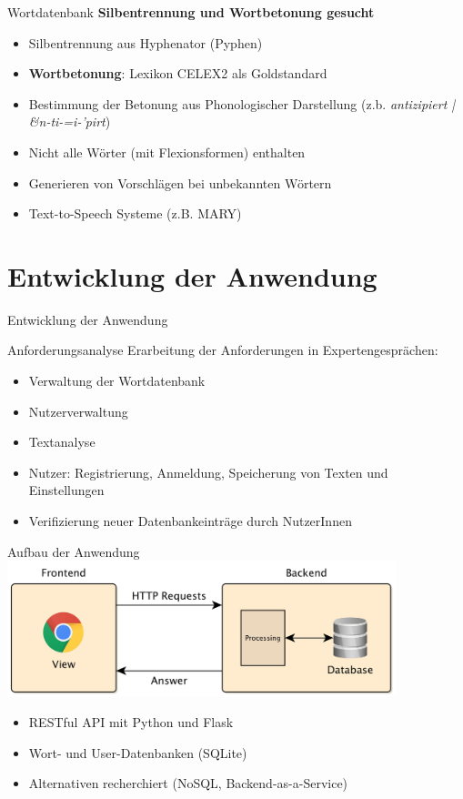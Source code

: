 \documentclass{beamer}
\begin{document}
\begin{frame}{Wortdatenbank}
\textbf{Silbentrennung und Wortbetonung gesucht}
\begin{itemize}
	\item Silbentrennung aus Hyphenator (Pyphen)
	\item \textbf{Wortbetonung}: Lexikon CELEX2 als Goldstandard
	\item Bestimmung der Betonung aus Phonologischer Darstellung (z.b. \textit{antizipiert | \&n-ti-=i-'pirt})
	\item Nicht alle Wörter (mit Flexionsformen) enthalten
	\item Generieren von Vorschlägen bei unbekannten Wörtern
	\item Text-to-Speech Systeme (z.B. MARY)
\end{itemize}
\end{frame}

\section{Entwicklung der Anwendung}
\begin{frame}
\centering
\huge{Entwicklung der Anwendung}
\end{frame}

\begin{frame}{Anforderungsanalyse}
Erarbeitung der Anforderungen in Expertengesprächen:
\begin{itemize}
	\item Verwaltung der Wortdatenbank
	\item Nutzerverwaltung
	\item Textanalyse
	\item Nutzer: Registrierung, Anmeldung, Speicherung von Texten und Einstellungen
	\item Verifizierung neuer Datenbankeinträge durch NutzerInnen
\end{itemize}
\end{frame}

\begin{frame}{Aufbau der Anwendung}
	\centering
	\includegraphics[width=0.85\textwidth]{../figures/frontendbackend}\\
	\begin{itemize}
		\item RESTful API mit Python und Flask
		\item Wort- und User-Datenbanken (SQLite)
		\item Alternativen recherchiert (NoSQL, Backend-as-a-Service)
	\end{itemize}
\end{frame}
\end{document}
